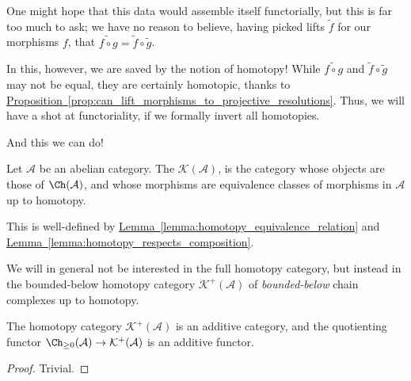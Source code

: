 \documentclass[main.tex]{subfiles}
\begin{document}
One might hope that this data would assemble itself functorially, but this is far too much to ask; we have no reason to believe, having picked lifts $\tilde{f}$ for our morphisms $f$, that $\widetilde{f \circ g} = \tilde{f} \circ \tilde{g}$.

In this, however, we are saved by the notion of homotopy! While $\widetilde{f \circ g}$ and $\tilde{f} \circ \tilde{g}$ may not be equal, they are certainly homotopic, thanks to \hyperref[prop:can_lift_morphisms_to_projective_resolutions]{Proposition~\ref*{prop:can_lift_morphisms_to_projective_resolutions}}. Thus, we will have a shot at functoriality, if we formally invert all homotopies.

And this we can do!

\begin{definition}
  \label{def:homotopy_category}
  Let $\mathcal{A}$ be an abelian category. The  $\mathcal{K}(\mathcal{A})$, is the category whose objects are those of $\Ch(\mathcal{A})$, and whose morphisms are equivalence classes of morphisms in $\mathcal{A}$ up to homotopy.
\end{definition}

This is well-defined by \hyperref[lemma:homotopy_equivalence_relation]{Lemma~\ref*{lemma:homotopy_equivalence_relation}} and \hyperref[lemma:homotopy_respects_composition]{Lemma~\ref*{lemma:homotopy_respects_composition}}.

We will in general not be interested in the full homotopy category, but instead in the bounded-below homotopy category $\mathcal{K}^{+}(\mathcal{A})$ of \emph{bounded-below} chain complexes up to homotopy.


\begin{lemma}
  \label{lemma:homotopy_category_is_additive}
  The homotopy category $\mathcal{K}^{+}(\mathcal{A})$ is an additive category, and the quotienting functor $\Ch_{\geq 0}(\mathcal{A}) \to \mathcal{K}^{+}(\mathcal{A})$ is an additive functor.
\end{lemma}
\begin{proof}
  Trivial.
\end{proof}

\end{document}
